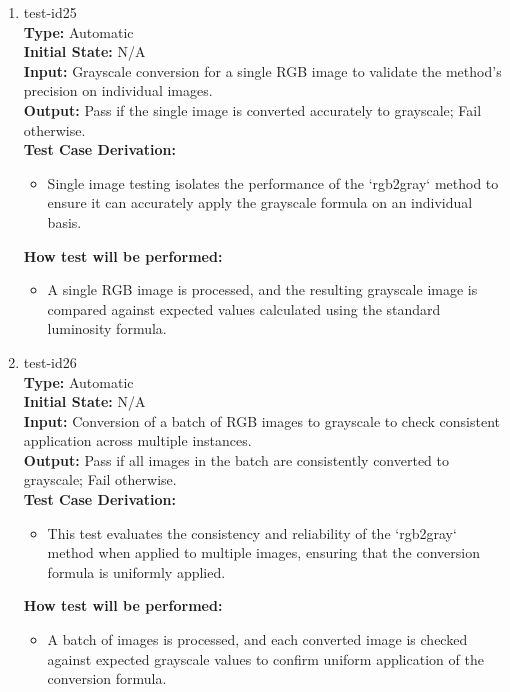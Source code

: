 \documentclass[12pt, titlepage]{article}
\begin{document}
\begin{enumerate}
\item{test-id25\\}
\textbf{Type:} Automatic\\
\textbf{Initial State:} N/A\\
\textbf{Input:} Grayscale conversion for a single RGB image to validate the 
method's precision on individual images.\\
\textbf{Output:} Pass if the single image is converted accurately to grayscale; 
Fail otherwise.\\
\textbf{Test Case Derivation:}
\begin{itemize}
  \item Single image testing isolates the performance of the `rgb2gray` method to ensure 
  it can accurately apply the grayscale formula on an individual basis.
\end{itemize}
\textbf{How test will be performed:}
\begin{itemize}
  \item A single RGB image is processed, and the resulting grayscale image is compared 
  against expected values calculated using the standard luminosity formula.
\end{itemize}

\item{test-id26\\}
\textbf{Type:} Automatic\\
\textbf{Initial State:} N/A\\
\textbf{Input:} Conversion of a batch of RGB images to grayscale to check consistent 
application across multiple instances.\\
\textbf{Output:} Pass if all images in the batch are consistently converted to grayscale; 
Fail otherwise.\\
\textbf{Test Case Derivation:}
\begin{itemize}
  \item This test evaluates the consistency and reliability of the `rgb2gray` method when 
  applied to multiple images, ensuring that the conversion formula is uniformly applied.
\end{itemize}
\textbf{How test will be performed:}
\begin{itemize}
  \item A batch of images is processed, and each converted image is checked against 
  expected grayscale values to confirm uniform application of the conversion formula.
\end{itemize}

\end{enumerate}
\end{document}
